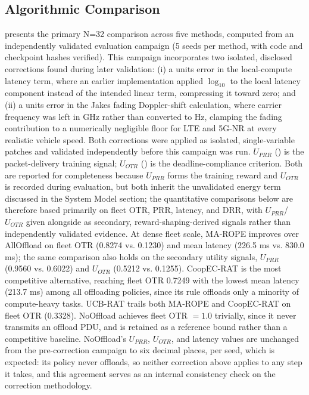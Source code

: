 \subsection{Algorithmic Comparison}

 presents the primary N=32 comparison across five methods, computed from an independently validated evaluation campaign (5 seeds per method, with code and checkpoint hashes verified). This campaign incorporates two isolated, disclosed corrections found during later validation: (i) a units error in the local-compute latency term, where an earlier implementation applied $\log_{10}$ to the local latency component instead of the intended linear term, compressing it toward zero; and (ii) a units error in the Jakes fading Doppler-shift calculation, where carrier frequency was left in GHz rather than converted to Hz, clamping the fading contribution to a numerically negligible floor for LTE and 5G-NR at every realistic vehicle speed. Both corrections were applied as isolated, single-variable patches and validated independently before this campaign was run. $U_{PRR}$ () is the packet-delivery training signal; $U_{OTR}$ () is the deadline-compliance criterion. Both are reported for completeness because $U_{PRR}$ forms the training reward and $U_{OTR}$ is recorded during evaluation, but both inherit the unvalidated energy term discussed in the System Model section; the quantitative comparisons below are therefore based primarily on fleet OTR, PRR, latency, and DRR, with $U_{PRR}$/$U_{OTR}$ given alongside as secondary, reward-shaping-derived signals rather than independently validated evidence. At dense fleet scale, MA-ROPE improves over AllOffload on fleet OTR (0.8274 vs. 0.1230) and mean latency (226.5 ms vs. 830.0 ms); the same comparison also holds on the secondary utility signals, $U_{PRR}$ (0.9560 vs. 0.6022) and $U_{OTR}$ (0.5212 vs. 0.1255). CoopEC-RAT is the most competitive alternative, reaching fleet OTR 0.7249 with the lowest mean latency (213.7 ms) among all offloading policies, since its rule offloads only a minority of compute-heavy tasks. UCB-RAT trails both MA-ROPE and CoopEC-RAT on fleet OTR (0.3328). NoOffload achieves fleet OTR $=1.0$ trivially, since it never transmits an offload PDU, and is retained as a reference bound rather than a competitive baseline. NoOffload's $U_{PRR}$, $U_{OTR}$, and latency values are unchanged from the pre-correction campaign to six decimal places, per seed, which is expected: its policy never offloads, so neither correction above applies to any step it takes, and this agreement serves as an internal consistency check on the correction methodology.

